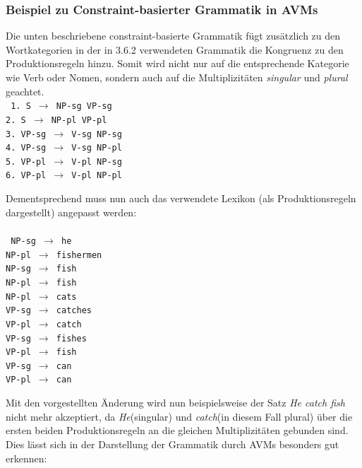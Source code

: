 \documentclass[12pt]{report}
\begin{document}
\subsubsection{Beispiel zu Constraint-basierter Grammatik in AVMs}
Die unten beschriebene constraint-basierte Grammatik fügt zusätzlich zu den Wortkategorien in der in 3.6.2 verwendeten Grammatik die Kongruenz zu den Produktionsregeln hinzu. Somit wird nicht nur auf die entsprechende Kategorie wie Verb oder Nomen, sondern auch auf die Multiplizitäten \textit{singular} und \textit{plural} geachtet. \newline
\\
\tt
1. S $\rightarrow$ NP-sg VP-sg\\
2. S $\rightarrow$ NP-pl VP-pl\\
3. VP-sg $\rightarrow$ V-sg NP-sg\\
4. VP-sg $\rightarrow$ V-sg NP-pl\\
5. VP-pl $\rightarrow$ V-pl NP-sg\\
6. VP-pl $\rightarrow$ V-pl NP-pl\\
\rm

Dementsprechend muss nun auch das verwendete Lexikon (als Produktionsregeln dargestellt) angepasst werden:\\
\\
\tt
NP-sg $\rightarrow$ he\\
NP-pl $\rightarrow$ fishermen\\
NP-sg $\rightarrow$ fish\\
NP-pl $\rightarrow$ fish\\
NP-pl $\rightarrow$ cats\\
VP-sg $\rightarrow$ catches\\
VP-pl $\rightarrow$ catch\\
VP-sg $\rightarrow$ fishes\\
VP-pl $\rightarrow$ fish\\
VP-sg $\rightarrow$ can\\
VP-pl $\rightarrow$ can\\
\rm

Mit den vorgestellten Änderung wird nun beispielsweise der Satz \textit{\glqq  He catch fish\grqq{}} nicht mehr akzeptiert, da \textit{\glqq  He\grqq{}}(singular) und \textit{\glqq  catch\grqq{}}(in diesem Fall plural) über die ersten beiden Produktionsregeln an die gleichen Multiplizitäten gebunden sind. 
Dies lässt sich in der Darstellung der Grammatik durch AVMs besonders gut erkennen:\\
\end{document}

